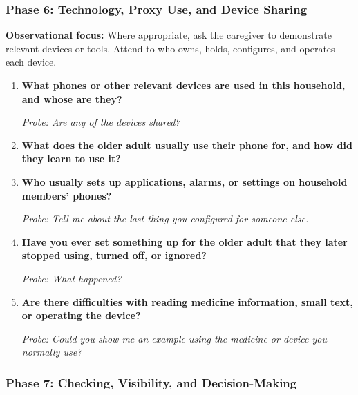 \subsubsection{Phase 6: Technology, Proxy Use, and Device Sharing}

\textbf{Observational focus:} Where appropriate, ask the caregiver to demonstrate relevant devices or tools. Attend to who owns, holds, configures, and operates each device.

\begin{enumerate}[resume]
  \item \textbf{What phones or other relevant devices are used in this household, and whose are they?}

  \textit{Probe: Are any of the devices shared?}
  \item \textbf{What does the older adult usually use their phone for, and how did they learn to use it?}
  \item \textbf{Who usually sets up applications, alarms, or settings on household members' phones?}

  \textit{Probe: Tell me about the last thing you configured for someone else.}
  \item \textbf{Have you ever set something up for the older adult that they later stopped using, turned off, or ignored?}

  \textit{Probe: What happened?}
  \item \textbf{Are there difficulties with reading medicine information, small text, or operating the device?}

  \textit{Probe: Could you show me an example using the medicine or device you normally use?}
\end{enumerate}

\subsubsection{Phase 7: Checking, Visibility, and Decision-Making}


